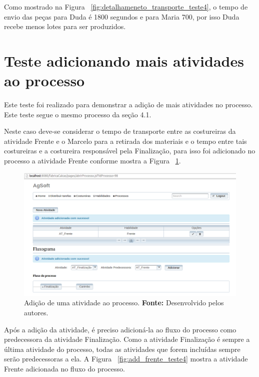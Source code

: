 \par Como mostrado na Figura ~\ref{fig:detalhameneto_transporte_teste4}, o tempo
de envio das peças para Duda é 1800 segundos e para Maria 700, por isso
Duda recebe menos lotes para ser produzidos.


\section{Teste adicionando mais atividades ao processo}

\par Este teste foi realizado para demonstrar a adição de mais atividades no
processo. Este teste segue o mesmo processo da seção 4.1.

\par Neste caso deve-se considerar o tempo de transporte entre as costureiras da atividade Frente e o Marcelo 
para a retirada dos materiais e o tempo entre tais costureiras e a costureira
responsável pela Finalização, para isso foi adicionado no processo a atividade
Frente conforme mostra a Figura ~\ref{fig:add_frente_teste5}.

\newpage

\begin{figure}[h!]
	\centerline{\includegraphics[scale=0.3]{./imagens/adiconar_atividade_frente_teste5.png}}
	\caption[Adição de uma atividade ao processo.]
	{Adição de uma atividade ao processo. \textbf{Fonte:} Desenvolvido pelos
	autores.}
	\label{fig:add_frente_teste5}
\end{figure}

\par Após a adição da atividade, é preciso adicioná-la ao fluxo do processo como
predecessora da atividade Finalização. Como a atividade Finalização é sempre a
última atividade do processo, todas as atividades que forem incluídas sempre
serão predecessoras a ela.  A Figura ~\ref{fig:add_frente_teste4} mostra a atividade Frente adicionada
no fluxo do processo.



